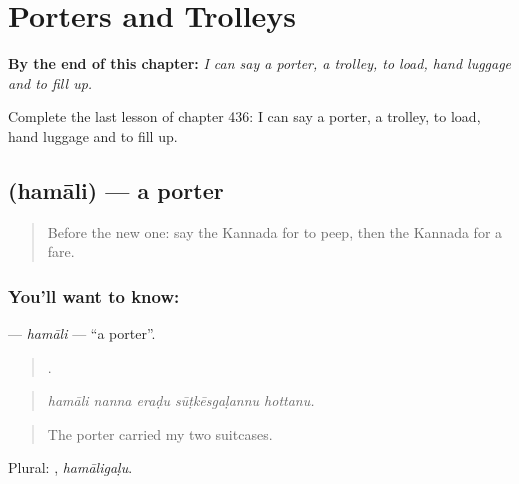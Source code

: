 
\chapter{Porters and Trolleys}
\label{ch:ka-porters-and-trolleys}

\begin{chapteropening}
\textbf{By the end of this chapter:} \emph{I can say a porter, a trolley, to load, hand luggage and to fill up.}

Complete the last lesson of chapter 436: I can say a porter, a trolley, to load, hand luggage and to fill up.
\end{chapteropening}

\section[\texorpdfstring{\kn{ಹಮಾಲಿ} (hamāli)}{ಹಮಾಲಿ (hamāli)}]{ (hamāli) — a porter}

\label{lesson:KA-C436-hamali}



\begin{quote}
Before the new one: say the Kannada for to peep, then the Kannada for a fare.
\end{quote}

\subsection*{You'll want to know: }
\textbf{} — \emph{hamāli} — \textquotedblleft{}a porter\textquotedblright{}.

\begin{quote}
    .
\end{quote}

\begin{quote}
\emph{hamāli nanna eraḍu sūṭkēsgaḷannu hottanu.}
\end{quote}

\begin{quote}
The porter carried my two suitcases.
\end{quote}

Plural: , \emph{hamāligaḷu}.

